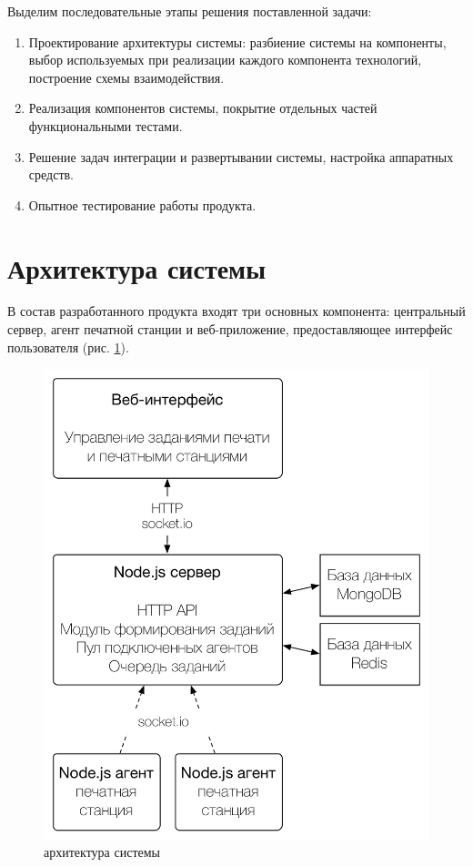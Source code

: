 \documentclass[a4paper,14pt,href]{article}
\begin{document}
Выделим последовательные этапы решения поставленной задачи:
\begin{enumerate}
  \item Проектирование архитектуры системы: разбиение системы на компоненты, выбор используемых при реализации
  каждого компонента технологий, построение схемы взаимодействия.

  \item Реализация компонентов системы, покрытие отдельных частей функциональными тестами.

  \item Решение задач интеграции и развертывании системы, настройка аппаратных средств.

  \item Опытное тестирование работы продукта.
\end{enumerate}

\newpage
\section{Архитектура системы}
В состав разработанного продукта входят три основных компонента: центральный сервер, агент печатной станции и
веб-приложение, предоставляющее интерфейс пользователя (рис. \ref{fig:Architecture}).

\begin{figure}[htbp]
\begin{center}
  \includegraphics[scale=0.7]{architecture.pdf}
    \caption{архитектура системы}
    \label{fig:Architecture}
\end{center}
\end{figure}
\end{document}
